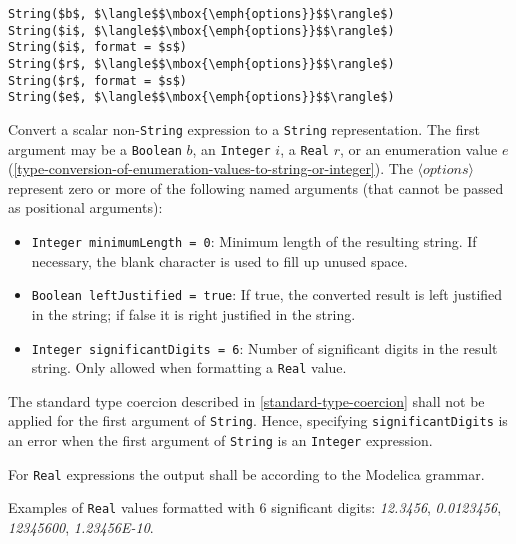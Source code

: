 \begin{operatordefinition*}[String]\label{modelica:to-String}
\begin{synopsis}\begin{lstlisting}
String($b$, $\langle$$\mbox{\emph{options}}$$\rangle$)
String($i$, $\langle$$\mbox{\emph{options}}$$\rangle$)
String($i$, format = $s$)
String($r$, $\langle$$\mbox{\emph{options}}$$\rangle$)
String($r$, format = $s$)
String($e$, $\langle$$\mbox{\emph{options}}$$\rangle$)
\end{lstlisting}\end{synopsis}
\begin{semantics}
Convert a scalar non-\lstinline!String! expression to a \lstinline!String! representation.
The first argument may be a \lstinline!Boolean! $b$, an \lstinline!Integer! $i$, a \lstinline!Real! $r$, or an enumeration value $e$ (\cref{type-conversion-of-enumeration-values-to-string-or-integer}).
The $\langle\mathit{options}\rangle$ represent zero or more of the following named arguments (that cannot be passed as positional arguments):
\begin{itemize}
\item
  \lstinline!Integer minimumLength = 0!: Minimum length of the resulting string.
  If necessary, the blank character is used to fill up unused space.
\item
  \lstinline!Boolean leftJustified = true!: If true, the converted result is left justified in the string; if false it is right justified in the string.
\item
  \lstinline!Integer significantDigits = 6!: Number of significant digits in the result string.
  Only allowed when formatting a \lstinline!Real! value.
\end{itemize}

The standard type coercion described in \cref{standard-type-coercion} shall not be applied for the first argument of \lstinline!String!.
Hence, specifying \lstinline!significantDigits! is an error when the first argument of \lstinline!String! is an \lstinline!Integer! expression.

For \lstinline!Real! expressions the output shall be according to the Modelica grammar.

\begin{nonnormative}
Examples of \lstinline!Real! values formatted with 6 significant digits: \emph{12.3456}, \emph{0.0123456}, \emph{12345600}, \emph{1.23456E-10}.
\end{nonnormative}


\end{semantics}
\end{operatordefinition*}
